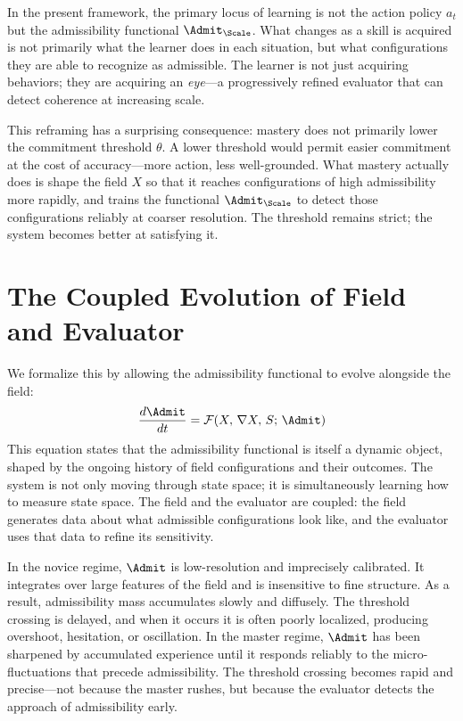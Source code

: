 \documentclass[11pt,oneside]{book}
\begin{document}
In the present framework, the primary locus of learning is not the action policy $a_t$ but the admissibility functional $\Admit_\Scale$. What changes as a skill is acquired is not primarily what the learner does in each situation, but what configurations they are able to recognize as admissible. The learner is not just acquiring behaviors; they are acquiring an \textit{eye}---a progressively refined evaluator that can detect coherence at increasing scale.

This reframing has a surprising consequence: mastery does not primarily lower the commitment threshold $\theta$. A lower threshold would permit easier commitment at the cost of accuracy---more action, less well-grounded. What mastery actually does is shape the field $X$ so that it reaches configurations of high admissibility more rapidly, and trains the functional $\Admit_\Scale$ to detect those configurations reliably at coarser resolution. The threshold remains strict; the system becomes better at satisfying it.

\section{The Coupled Evolution of Field and Evaluator}

We formalize this by allowing the admissibility functional to evolve alongside the field:
\begin{equation}
    \frac{d\Admit}{dt} = \mathcal{F}(X,\, \nabla X,\, S;\, \Admit)
\end{equation}
This equation states that the admissibility functional is itself a dynamic object, shaped by the ongoing history of field configurations and their outcomes. The system is not only moving through state space; it is simultaneously learning how to measure state space. The field and the evaluator are coupled: the field generates data about what admissible configurations look like, and the evaluator uses that data to refine its sensitivity.

In the novice regime, $\Admit$ is low-resolution and imprecisely calibrated. It integrates over large features of the field and is insensitive to fine structure. As a result, admissibility mass accumulates slowly and diffusely. The threshold crossing is delayed, and when it occurs it is often poorly localized, producing overshoot, hesitation, or oscillation. In the master regime, $\Admit$ has been sharpened by accumulated experience until it responds reliably to the micro-fluctuations that precede admissibility. The threshold crossing becomes rapid and precise---not because the master rushes, but because the evaluator detects the approach of admissibility early.
\end{document}
